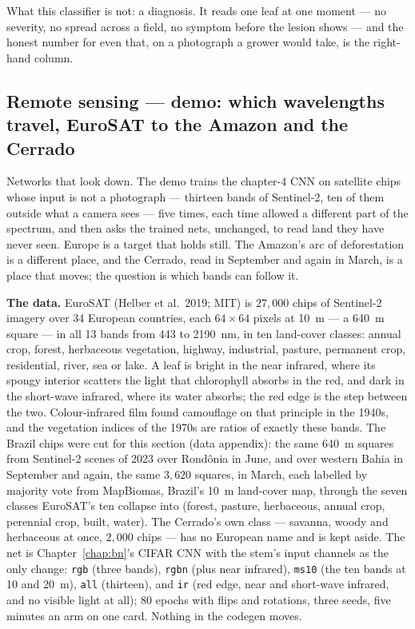 \medskip\noindent What this classifier is not: a diagnosis. It reads one
leaf at one moment --- no severity, no spread across a field, no symptom
before the lesion shows --- and the honest number for even that, on a
photograph a grower would take, is the right-hand column.

\subsection{Remote sensing --- demo: which wavelengths travel, EuroSAT to the Amazon and the Cerrado}
\label{sec:bestiary_remote_sensing}

Networks that look down. The demo trains the chapter-4 CNN on satellite
chips whose input is not a photograph --- thirteen bands of Sentinel-2,
ten of them outside what a camera sees --- five times, each time allowed a
different part of the spectrum, and then asks the trained nets, unchanged,
to read land they have never seen. Europe is a target that holds still.
The Amazon's arc of deforestation is a different place, and the Cerrado,
read in September and again in March, is a place that moves; the question
is which bands can follow it.

\textbf{The data.} EuroSAT (Helber et al.\ 2019; MIT) is $27{,}000$ chips
of Sentinel-2 imagery over 34 European countries, each $64\times64$ pixels
at 10~m --- a 640~m square --- in all 13 bands from 443 to 2190~nm, in ten
land-cover classes: annual crop, forest, herbaceous vegetation, highway,
industrial, pasture, permanent crop, residential, river, sea or lake. A
leaf is bright in the near infrared, where its spongy interior scatters
the light that chlorophyll absorbs in the red, and dark in the short-wave
infrared, where its water absorbs; the red edge is the step between the
two. Colour-infrared film found camouflage on that principle in the 1940s,
and the vegetation indices of the 1970s are ratios of exactly these bands.
The Brazil chips were cut for this section (data appendix): the same 640~m
squares from Sentinel-2 scenes of 2023 over Rond\^onia in June, and over
western Bahia in September and again, the same $3{,}620$ squares, in
March, each labelled by majority vote from MapBiomas, Brazil's 10~m
land-cover map, through the seven classes EuroSAT's ten collapse into
(forest, pasture, herbaceous, annual crop, perennial crop, built, water).
The Cerrado's own class --- savanna, woody and herbaceous at once,
$2{,}000$ chips --- has no European name and is kept aside. The net is
Chapter~\ref{chap:bn}'s CIFAR CNN with the stem's input channels as the
only change: \texttt{rgb} (three bands), \texttt{rgbn} (plus near
infrared), \texttt{ms10} (the ten bands at 10 and 20~m), \texttt{all}
(thirteen), and \texttt{ir} (red edge, near and short-wave infrared, and
no visible light at all); 80 epochs with flips and rotations, three seeds,
five minutes an arm on one card. Nothing in the codegen moves.

